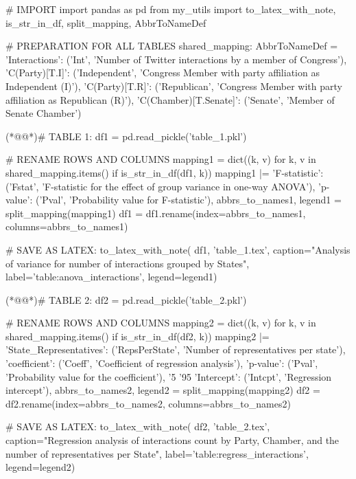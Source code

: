 \documentclass[11pt]{article}
\begin{document}
\begin{python}

# IMPORT
import pandas as pd
from my_utils import to_latex_with_note, is_str_in_df, split_mapping, AbbrToNameDef

# PREPARATION FOR ALL TABLES
shared_mapping: AbbrToNameDef = {
    'Interactions': ('Int', 'Number of Twitter interactions by a member of Congress'),
    'C(Party)[T.I]': ('Independent', 'Congress Member with party affiliation as Independent (I)'),
    'C(Party)[T.R]': ('Republican', 'Congress Member with party affiliation as Republican (R)'),
    'C(Chamber)[T.Senate]': ('Senate', 'Member of Senate Chamber')
}

(*@@*)# TABLE 1:
df1 = pd.read_pickle('table_1.pkl')

# RENAME ROWS AND COLUMNS
mapping1 = dict((k, v) for k, v in shared_mapping.items() if is_str_in_df(df1, k)) 
mapping1 |= {
    'F-statistic': ('Fstat', 'F-statistic for the effect of group variance in one-way ANOVA'),
    'p-value': ('Pval', 'Probability value for F-statistic'),
}
abbrs_to_names1, legend1 = split_mapping(mapping1)
df1 = df1.rename(index=abbrs_to_names1, columns=abbrs_to_names1)

# SAVE AS LATEX:
to_latex_with_note(
    df1, 'table_1.tex',
    caption="Analysis of variance for number of interactions grouped by States", 
    label='table:anova_interactions',
    legend=legend1)

(*@@*)# TABLE 2:
df2 = pd.read_pickle('table_2.pkl')

# RENAME ROWS AND COLUMNS
mapping2 = dict((k, v) for k, v in shared_mapping.items() if is_str_in_df(df2, k)) 
mapping2 |= {
    'State_Representatives': ('RepsPerState', 'Number of representatives per state'),
    'coefficient': ('Coeff', 'Coefficient of regression analysis'),
    'p-value': ('Pval', 'Probability value for the coefficient'),
    '5%
    '95%
    'Intercept': ('Intcpt', 'Regression intercept'),
}
abbrs_to_names2, legend2 = split_mapping(mapping2)
df2 = df2.rename(index=abbrs_to_names2, columns=abbrs_to_names2)

# SAVE AS LATEX:
to_latex_with_note(
    df2, 'table_2.tex',
    caption="Regression analysis of interactions count by Party, Chamber, and the number of representatives per State", 
    label='table:regress_interactions',
    legend=legend2)

\end{python}
\end{document}
